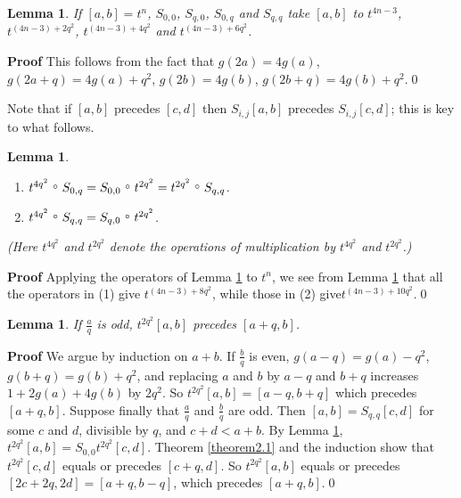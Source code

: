 \documentclass{monsky2009}
\newenvironment{proof}[1][]{\textbf{Proof #1\hspace{.3em}}}{}
\newtheorem{lemma}[definition]{Lemma}
\providecommand{\comp}{\ensuremath\raisebox{.2em}{\,\,\mbox{$\scriptstyle\circ$}}\,\,}
\begin{document}
\begin{lemma}%
\label{lemma2.3}
If $[a,b]=t^{n}$, $S_{0,0}$, $S_{q,0}$, $S_{0,q}$ and $S_{q,q}$ take $[a,b]$ to $t^{4n-3}$, $t^{(4n-3)+2q^{2}}$, $t^{(4n-3)+4q^{2}}$ and $t^{(4n-3)+6q^{2}}$.
\end{lemma}

\begin{proof}
This follows from the fact that $g(2a)=4g(a)$, $g(2a+q)=4g(a)+q^{2}$, $g(2b)=4g(b)$, $g(2b+q)=4g(b)+q^{2}$.\qed
\end{proof}

Note that if $[a,b]$ precedes $[c,d]$ then $S_{i,j}[a,b]$ precedes $S_{i,j}[c,d]$; this is key to what follows.

\begin{lemma}
\label{lemma2.4} \hspace{1em}\\%
\vspace{-3ex}
\begin{enumerate}
\item[(1)] $t^{4q^{2}}\comp S_{0,q} = S_{0,0} \comp t^{2q^{2}} = t^{2q^{2}}\comp S_{q,q}$.
\item[(2)] $t^{4q^{2}}\comp S_{q,q} = S_{q,0} \comp t^{2q^{2}}$.
\end{enumerate}

(Here $t^{4q^{2}}$ and $t^{2q^{2}}$ denote the operations of multiplication by $t^{4q^{2}}$ and $t^{2q^{2}}$.)
\end{lemma}

\begin{proof}
Applying the operators of Lemma \ref{lemma2.4} to $t^{n}$, we see from Lemma \ref{lemma2.3} that all the operators in (1) give $t^{(4n-3)+8q^{2}}$, while those in (2) give\linebreak $t^{(4n-3)+10q^{2}}$.\qed
\end{proof}

\begin{lemma}%
\label{lemma2.5}
If $\frac{a}{q}$ is odd, $t^{2q^{2}}[a,b]$ precedes $[a+q,b]$.
\end{lemma}

\begin{proof}
We argue by induction on $a+b$. If $\frac{b}{q}$ is even, $g(a-q)=g(a)-q^{2}$,  $g(b+q)=g(b)+q^{2}$, and replacing $a$ and $b$ by $a-q$ and $b+q$ increases $1+2g(a)+4g(b)$ by $2q^{2}$. So $t^{2q^{2}}[a,b]=[a-q,b+q]$ which precedes $[a+q,b]$. Suppose finally that $\frac{a}{q}$ and $\frac{b}{q}$ are odd. Then $[a,b]= S_{q,q}[c,d]$ for some $c$ and $d$, divisible by $q$, and $c+d<a+b$. By Lemma \ref{lemma2.4}, $t^{2q^{2}}[a,b]=S_{0,0}t^{2q^{2}}[c,d]$. Theorem \ref{theorem2.1} and the induction show that $t^{2q^{2}}[c,d]$ equals or precedes $[c+q,d]$. So $t^{2q^{2}}[a,b]$ equals or precedes $[2c+2q,2d]=[a+q, b-q]$, which precedes $[a+q,b]$.\qed
\end{proof}
\end{document}
